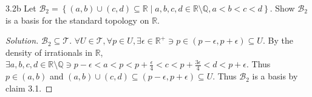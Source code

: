 \documentclass{article}
\newcommand*{\T}{\mathcal{T}}
\newcommand*{\B}{\mathcal{B}}
\newcommand{\R}{\mathbb{R}}
\newcommand{\Q}{\mathbb{Q}}
\newenvironment{solution}
{\renewcommand\qedsymbol{$\blacksquare$}\begin{proof}[Solution]}
{\end{proof}}
\begin{document}
\begin{PROB}{3.2b}\label{Problem 3.2b.}
    Let $\B_2 = \left\{ (a, b) \cup (c, d) \subseteq \R \mid a, b, c, d \in \R \setminus \Q, a < b < c < d \right\}$. Show $\B_2$ is a basis for the standard topology on $\R$.    
\end{PROB}
\begin{solution}
    $\B_2 \subseteq \T$. $\forall U \in \T, \forall p \in U, \exists \epsilon \in \R^+ \ni p \in (p - \epsilon, p + \epsilon) \subseteq U$. By the density of irrationals in $\R$, $\exists a, b, c, d \in \R \setminus \Q \ni p - \epsilon < a < p < p + \frac{\epsilon}{4} < c < p +\frac{3\epsilon}{4} < d < p + \epsilon$. Thus $p \in (a, b)$ and $(a, b) \cup (c, d) \subseteq (p - \epsilon, p + \epsilon) \subseteq U$. Thus $\B_2$ is a basis by claim 3.1.        
\end{solution}

\bigskip
\end{document}
